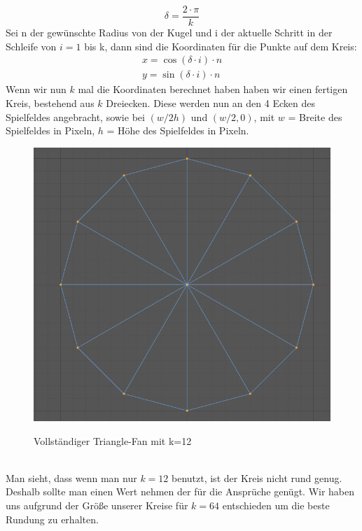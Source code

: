 	\begin{equation}\label{eq:delta}
		\delta =\frac{2 \cdot \pi}{k} 
	\end{equation}
	Sei n der gewünschte Radius von der Kugel und i der aktuelle Schritt in der Schleife von $i=1$ bis k, dann sind die Koordinaten für die Punkte auf dem Kreis:
	\begin{equation}\label{eq:circleCoord}
		\begin{aligned}
			x = \cos (\delta \cdot i) \cdot n\\
			y = \sin (\delta \cdot i) \cdot n
		\end{aligned}
	\end{equation}
	Wenn wir nun $k$ mal die Koordinaten berechnet haben haben wir einen fertigen Kreis, bestehend aus $k$ Dreiecken. Diese werden nun an den 4 Ecken des Spielfeldes angebracht, sowie bei $(w /2 h)$ und $(w/2, 0)$, mit $w$ = Breite des Spielfeldes in Pixeln, $h$ = Höhe des Spielfeldes in Pixeln. \\
		\begin{figure}[h]
		\centering
		\caption{Vollständiger Triangle-Fan mit k=12}
		\includegraphics[width=\textwidth/2]{bilder/k12kreis.png} \\
	\end{figure} \\
	Man sieht, dass wenn man nur $k = 12 $ benutzt, ist der Kreis nicht rund genug. Deshalb sollte man einen Wert nehmen der für die Ansprüche genügt. Wir haben uns aufgrund der Größe unserer Kreise für $k=64$ entschieden um die beste Rundung zu erhalten.\\
